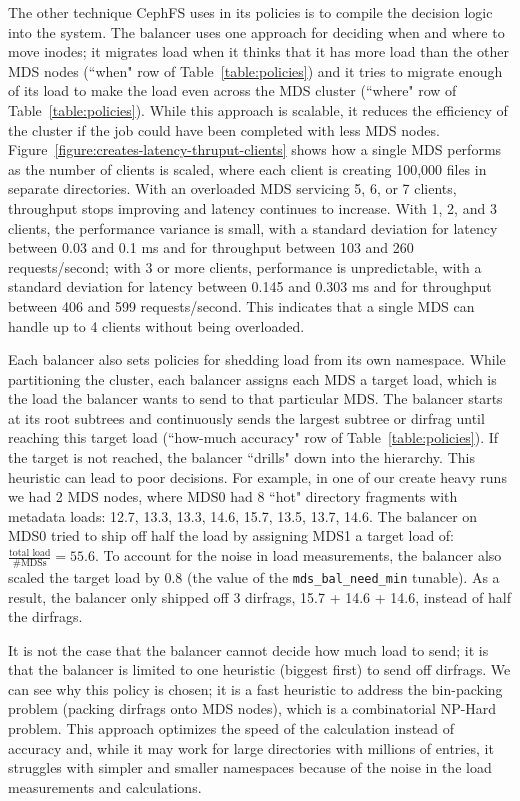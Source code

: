 The other technique CephFS uses in its policies is to compile the decision logic into the system. The balancer uses one approach for deciding when and where to move inodes; it migrates load when it thinks that it has more load than the other MDS nodes (``when" row of Table~\ref{table:policies}) and it tries to migrate enough of its load to make the load even across the MDS cluster (``where" row of Table~\ref{table:policies}). While this approach is scalable, it reduces the efficiency of the cluster if the job could have been completed with less MDS nodes. Figure~\ref{figure:creates-latency-thruput-clients} shows how a single MDS performs as the number of clients is scaled, where each client is creating 100,000 files in separate directories. With an overloaded MDS servicing 5, 6, or 7 clients, throughput stops improving and latency continues to increase. With 1, 2, and 3 clients, the performance variance is small, with a standard deviation for latency between 0.03 and 0.1 ms and for throughput between 103 and 260 requests/second; with 3 or more clients, performance is unpredictable, with a standard deviation for latency between 0.145 and 0.303 ms and for throughput between 406 and 599 requests/second. This indicates that a single MDS can handle up to 4 clients without being overloaded.

Each balancer also sets policies for shedding load from its own namespace.  While partitioning the cluster, each balancer assigns each MDS a target load, which is the load the balancer wants to send to that particular MDS. The balancer starts at its root subtrees and continuously sends the largest subtree or dirfrag until reaching this target load (``how-much accuracy" row of Table~\ref{table:policies}). If the target is not reached, the balancer ``drills" down into the hierarchy. This heuristic can lead to poor decisions. For example, in one of our create heavy runs we had 2 MDS nodes, where MDS0 had 8 ``hot" directory fragments with metadata loads: 12.7, 13.3, 13.3, 14.6, 15.7, 13.5, 13.7, 14.6. The balancer on MDS0 tried to ship off half the load by assigning MDS1 a target load of:
\(\frac{\text{total load}}{\text{\# MDSs}} = 55.6\). 
To account for the noise in load measurements, the balancer also scaled the target load by 0.8 (the value of the \texttt{mds\_bal\_need\_min} tunable). As a result, the balancer only shipped off 3 dirfrags, 15.7 + 14.6 + 14.6, instead of half the dirfrags. 

It is not the case that the balancer cannot decide how much load to send; it is that the balancer is limited to one heuristic (biggest first) to send off dirfrags. We can see why this policy is chosen; it is a fast heuristic to address the bin-packing problem (packing dirfrags onto MDS nodes), which is a combinatorial NP-Hard problem. This approach optimizes the speed of the calculation instead of accuracy and, while it may work for large directories with millions of entries, it struggles with simpler and smaller namespaces because of the noise in the load measurements and calculations.

